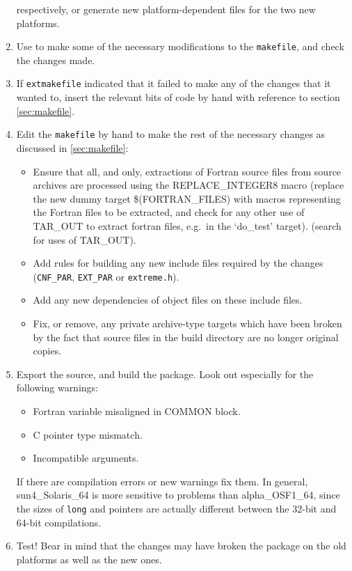 \documentclass[twoside,11pt,nolof]{starlink}
\providecommand{\xroutine}[1]{\htmlref{\texttt{#1}}{#1}}
\providecommand{\file}[1]{\texttt{#1}}
\providecommand{\routine}[1]{\texttt{#1}}
\providecommand{\cc}[1]{\texttt{#1}}
\newenvironment{squote}{\begin{small}}{\end{small}}
\begin{document}
\begin{enumerate}
respectively, or generate new platform-dependent files for the
two new platforms.
%
\item
Use \xroutine{extmakefile} to make some of the necessary modifications
to the \file{makefile}, and check the changes made.
\begin{squote}
\begin{terminalv}
\end{terminalv}
\end{squote}
%
\item
If \routine{extmakefile} indicated that it failed to make any of the
changes that it wanted to, insert the relevant bits of code by hand
with reference to section \ref{sec:makefile}.
%
\item
Edit the \file{makefile} by hand to make the rest of the necessary changes
as discussed in \ref{sec:makefile}:
\begin{itemize}
\item
Ensure that all, and only,
extractions of Fortran source files from source archives
are processed using the REPLACE\_INTEGER8 macro
(replace the new dummy target \$(FORTRAN\_FILES) with macros representing
the Fortran files to be extracted, and check for any other
use of TAR\_OUT to extract fortran files, e.g.\ in the `do\_test' target).
(search for uses of TAR\_OUT).
\item
Add rules for building any new include files required by the changes
(\file{CNF\_PAR}, \file{EXT\_PAR} or \file{extreme.h}).
\item
Add any new dependencies of object files on these include files.
\item
Fix, or remove, any private archive-type targets which have been broken
by the fact that source files in the build directory are no longer
original copies.
\end{itemize}
%
\item
Export the source, and build the package.
Look out especially for the following warnings:
\begin{itemize}
\item Fortran variable misaligned in COMMON block.
\item C pointer type mismatch.
\item Incompatible arguments.
\end{itemize}
If there are compilation errors or new warnings fix them.
In general, sun4\_Solaris\_64 is more sensitive to problems than
alpha\_OSF1\_64, since the sizes of \cc{long} and pointers are
actually different between the 32-bit and 64-bit compilations.
%
\item Test!
Bear in mind that
the changes may have broken the package on the old platforms
as well as the new ones.
%
\end{enumerate}
\end{document}
